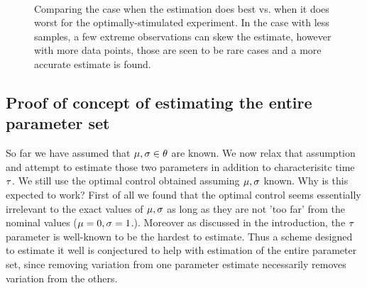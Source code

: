 \documentclass{article}
\begin{document}
\begin{figure}[h]
\begin{center} 
\\
\caption[Estimation Detail View for the Optimally-Stimulated
Experiment]{Comparing the case when the estimation does best vs. when it does
worst for the optimally-stimulated experiment. In the case with less samples, a
few extreme observations can skew the estimate, however with more data points,
those are seen to be rare cases and a more accurate estimate is found.}
\label{fig:batch_estimtion_in_detail}
\end{center}
\end{figure}


\subsection{Proof of concept of estimating the entire parameter set}
So far we have assumed that $\mu, {\sigma } \in {\theta}$ are known. We now relax that
assumption and attempt to estimate those two parameters in addition to
characterisitc time ${ \tau }$. We still use the optimal control obtained assuming
${\mu },{\sigma }$ known. Why is this expected to work? First of all we found that the
optimal control seems essentially irrelevant to the exact values of ${\mu },{\sigma }$ as
long as they are not 'too far' from the nominal values (${\mu }=0, {\sigma }=1$.). Moreover
as discussed in the introduction, the ${ \tau }$ parameter is well-known to be the
hardest to estimate. Thus a scheme designed to estimate it well is conjectured
to help with estimation of the entire parameter set, since removing variation
from one parameter estimate necessarily removes variation from the others.
\end{document}
